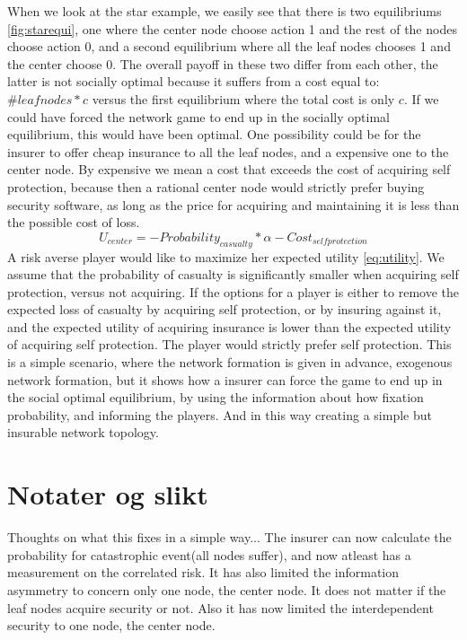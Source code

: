  When we look at the star example, we easily see that there is two equilibriums \ref{fig:starequi}, one where the center node choose action 1 and the rest of the nodes choose action 0, and a second equilibrium where all the leaf nodes chooses 1 and the center choose 0.
The overall payoff in these two differ from each other, the latter is not socially optimal because it
 suffers from a cost equal to: $\#leaf nodes*c$ versus the first equilibrium where the total cost is only $c$.
If we could have forced the network game to end up in the socially optimal equilibrium, this would have been optimal. 
One possibility could be for the insurer to offer cheap insurance to all the leaf nodes, and a expensive one to the center node. By expensive we mean a cost that exceeds the cost of acquiring self protection, because then a rational center node would strictly prefer buying security software, as long as the price for acquiring and maintaining it is less than the possible cost of loss.
\begin{equation}
 U_{center}=-Probability_{casualty}*\alpha-Cost_{selfprotection}
 \label{eq:utility}
 \end{equation} 
A risk averse player would like to maximize her expected utility \ref{eq:utility}. We assume that the probability of casualty is significantly smaller when acquiring self protection, versus not acquiring. If the options for a player is
 either to remove the expected loss of casualty by acquiring self protection, or by insuring against it,
and the expected utility of acquiring insurance is lower than the expected utility of acquiring self protection. The player would strictly prefer self protection. 
This is a simple scenario, where the network formation is given in advance, exogenous network formation, 
but it shows how a insurer can force the game to end up in the social optimal equilibrium, by using the information about how fixation probability, and informing the players. 
And in this way creating a simple but insurable network topology. 
\section{Notater og slikt}
Thoughts on what this fixes in a simple way...
The insurer can now calculate the probability for catastrophic event(all nodes suffer), and now atleast has a measurement on the correlated risk. It has also limited the information asymmetry to concern only one node, the center node. It does not matter if the leaf nodes acquire security or not. Also it has now limited the interdependent security to one node, the center node.

